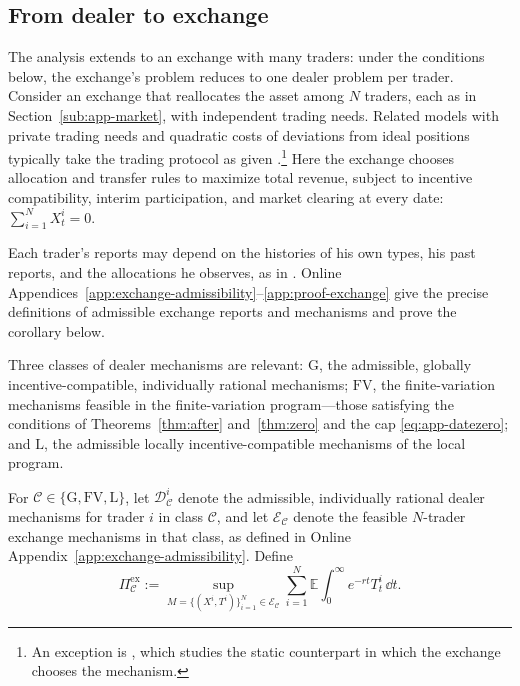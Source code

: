 \documentclass[12pt]{article}
\newcommand{\E}{\mathbb{E}}
\begin{document}
\subsection{From dealer to exchange}
\label{sub:app-exchange}
The analysis extends to an exchange with many traders: under the
conditions below, the exchange's problem reduces to one dealer problem
per trader. Consider an exchange that reallocates the asset among \(N\)
traders, each as in Section~\ref{sub:app-market}, with independent
trading needs. Related models with private trading needs and quadratic
costs of deviations from ideal positions typically take the trading
protocol as given
\citep[e.g.,][]{du2017optimal,malamud2017decentralized,
chen2021fragmentation,antill2021augmenting}.\footnote{An exception is
\citet{chen2024optimal}, which studies the static counterpart in which
the exchange chooses the mechanism.} Here the exchange chooses
allocation and transfer rules to maximize total revenue, subject to
incentive compatibility, interim participation, and market clearing at
every date: \(\sum_{i=1}^N X_t^i=0\).

Each trader's reports may depend on the histories of his own types, his
past reports, and the allocations he observes, as in
\citet{pavan2014dynamic}.
Online Appendices~\ref{app:exchange-admissibility}--\ref{app:proof-exchange}
give the precise definitions of admissible exchange reports and
mechanisms and prove the corollary
below.

Three classes of dealer mechanisms are relevant: \(\mathrm G\), the
admissible, globally incentive-compatible, individually rational
mechanisms; \(\mathrm{FV}\), the finite-variation mechanisms feasible
in the finite-variation program---those satisfying the conditions of
Theorems~\ref{thm:after} and~\ref{thm:zero} and the cap
\eqref{eq:app-datezero}; and \(\mathrm L\), the admissible locally
incentive-compatible mechanisms of the local program.

For \(\mathcal C\in\{\mathrm G,\mathrm{FV},\mathrm L\}\), let
\(\mathcal D_{\mathcal C}^i\) denote the admissible, individually rational
dealer mechanisms for trader \(i\) in class \(\mathcal C\), and let
\(\mathcal E_{\mathcal C}\) denote the feasible \(N\)-trader exchange
mechanisms in that class, as defined in
Online Appendix~\ref{app:exchange-admissibility}. Define
\[
  \Pi_{\mathcal C}^{\mathrm{ex}}
  :=
  \sup_{M=\{(X^i,T^i)\}_{i=1}^N\in\mathcal E_{\mathcal C}}
  \sum_{i=1}^N
  \E\int_0^\infty e^{-rt}T_t^i\,\dd t.
\]
\end{document}
